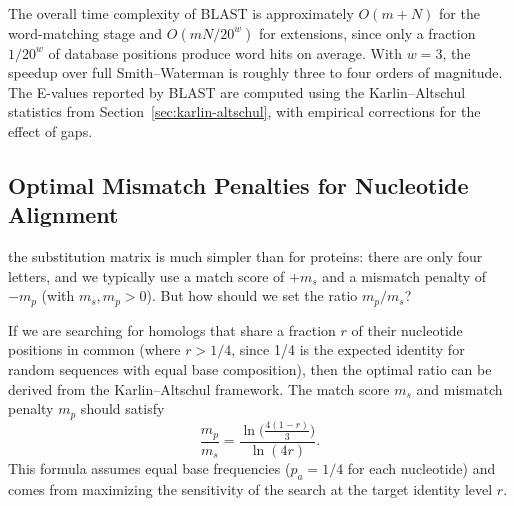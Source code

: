 The overall time complexity of BLAST is approximately $O(m + N)$ for the word-matching stage and $O(mN/20^w)$ for extensions, since only a fraction $1/20^w$ of database positions produce word hits on average. With $w = 3$, the speedup over full Smith--Waterman is roughly three to four orders of magnitude. The E-values reported by BLAST are computed using the Karlin--Altschul statistics from Section~\ref{sec:karlin-altschul}, with empirical corrections for the effect of gaps.


\subsection{Optimal Mismatch Penalties for Nucleotide Alignment}
\label{sec:optimal-mismatch}

 the substitution matrix is much simpler than for proteins: there are only four letters, and we typically use a match score of $+m_s$ and a mismatch penalty of $-m_p$ (with $m_s, m_p > 0$). But how should we set the ratio $m_p / m_s$?

If we are searching for homologs that share a fraction $r$ of their nucleotide positions in common (where $r > 1/4$, since 1/4 is the expected identity for random sequences with equal base composition), then the optimal ratio can be derived from the Karlin--Altschul framework. The match score $m_s$ and mismatch penalty $m_p$ should satisfy
\begin{equation}
  \label{eq:optimal-mismatch}
  \frac{m_p}{m_s} = \frac{\ln\!\bigl(\frac{4(1-r)}{3}\bigr)}{\ln(4r)}.
\end{equation}
This formula assumes equal base frequencies ($p_a = 1/4$ for each nucleotide) and comes from maximizing the sensitivity of the search at the target identity level $r$.

